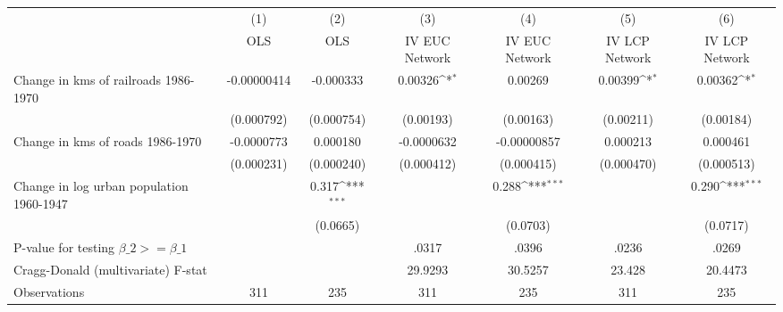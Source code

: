 {
\def\sym#1{\ifmmode^{#1}\else\(^{#1}\)\fi}
\begin{tabular}{l*{6}{c}}
\hline\hline
                &\multicolumn{1}{c}{(1)}&\multicolumn{1}{c}{(2)}&\multicolumn{1}{c}{(3)}&\multicolumn{1}{c}{(4)}&\multicolumn{1}{c}{(5)}&\multicolumn{1}{c}{(6)}\\
                &\multicolumn{1}{c}{OLS}&\multicolumn{1}{c}{OLS}&\multicolumn{1}{c}{IV EUC Network}&\multicolumn{1}{c}{IV EUC Network}&\multicolumn{1}{c}{IV LCP Network}&\multicolumn{1}{c}{IV LCP Network}\\
\hline
Change in kms of railroads 1986-1970&-0.00000414         &-0.000333         &  0.00326\sym{*}  &  0.00269         &  0.00399\sym{*}  &  0.00362\sym{*}  \\
                &(0.000792)         &(0.000754)         &(0.00193)         &(0.00163)         &(0.00211)         &(0.00184)         \\
[1em]
Change in kms of roads 1986-1970&-0.0000773         & 0.000180         &-0.0000632         &-0.00000857         & 0.000213         & 0.000461         \\
                &(0.000231)         &(0.000240)         &(0.000412)         &(0.000415)         &(0.000470)         &(0.000513)         \\
[1em]
Change in log urban population 1960-1947&                  &    0.317\sym{***}&                  &    0.288\sym{***}&                  &    0.290\sym{***}\\
                &                  & (0.0665)         &                  & (0.0703)         &                  & (0.0717)         \\
\hline
P-value for testing $\beta\_{2} >= \beta\_{1}$&                  &                  &    .0317         &    .0396         &    .0236         &    .0269         \\
Cragg-Donald (multivariate) F-stat&                  &                  &  29.9293         &  30.5257         &   23.428         &  20.4473         \\
Observations    &      311         &      235         &      311         &      235         &      311         &      235         \\
\hline\hline
\end{tabular}
}
